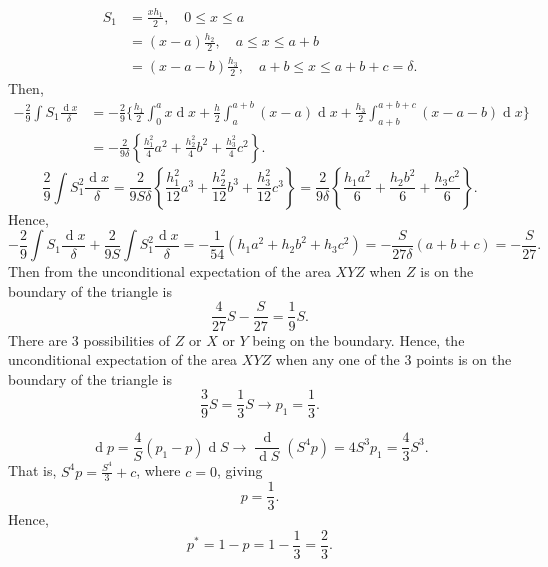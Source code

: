 \documentclass{article}
\DeclareMathOperator{\dif}{d}
\begin{document}
\begin{equation}
    \begin{split}
        S_{1} &= \frac{xh_{1}}{2},\quad 0 \leqslant x \leqslant a 
        \\
        &= (x - a)\frac{h_{2}}{2},\quad a \leqslant x \leqslant a + b
        \\
        &= (x - a - b)\frac{h_{3}}{2},\quad a + b \leqslant x \leqslant a + b + c = \delta.
    \end{split}
\end{equation}
Then,
\begin{equation}
    \begin{split}
        -\frac{2}{9}\int S_{1}\frac{\dif x}{\delta} &= -\frac{2}{9}\Bigg\{\frac{h_{1}}{2}\int_{0}^{a}x\dif x + \frac{h}{2}\int_{a}^{a + b}(x - a)\dif x + \frac{h_{3}}{2}\int_{a + b}^{a + b + c}(x - a - b)\dif x\Bigg\}
        \\
        &= -\frac{2}{9\delta}\left\{\frac{h_{1}^{2}}{4}a^{2} + \frac{h_{2}^{2}}{4}b^{2} + \frac{h_{3}^{2}}{4}c^{2}\right\}.
    \end{split}
\end{equation}
\begin{equation}
    \frac{2}{9}\int S_{1}^{2}\frac{\dif x}{\delta} = \frac{2}{9S\delta}\left\{\frac{h_{1}^{2}}{12}a^{3} + \frac{h_{2}^{2}}{12}b^{3} + \frac{h_{3}^{2}}{12}c^{3}\right\} = \frac{2}{9\delta}\left\{\frac{h_{1}a^{2}}{6} + \frac{h_{2}b^{2}}{6} + \frac{h_{3}c^{2}}{6}\right\}.
\end{equation}
Hence,
\begin{equation}
    -\frac{2}{9}\int S_{1}\frac{\dif x}{\delta} + \frac{2}{9S}\int S_{1}^{2}\frac{\dif x}{\delta} = -\frac{1}{54}(h_{1}a^{2} + h_{2}b^{2} + h_{3}c^{2}) = -\frac{S}{27\delta}(a + b + c) = -\frac{S}{27}.
\end{equation}
Then from the unconditional expectation of the area $XYZ$ when $Z$ is on the boundary of the triangle is
\begin{equation}
    \frac{4}{27}S - \frac{S}{27} = \frac{1}{9}S.
\end{equation}
There are $3$ possibilities of $Z$ or $X$ or $Y$ being on the boundary.
Hence, the unconditional expectation of the area $XYZ$ when any one of the $3$ points is on the boundary of the triangle is
\begin{equation}
    \frac{3}{9}S = \frac{1}{3}S \rightarrow p_{1} = \frac{1}{3}.
\end{equation}

\begin{equation}
    \dif p = \frac{4}{S}(p_{1} - p)\dif S \rightarrow \frac{\dif}{\dif S}(S^{4}p) = 4S^{3}p_{1} = \frac{4}{3}S^{3}.
\end{equation}
That is, $S^{4}p = \tfrac{S^{4}}{3} + c$, where $c = 0$, giving
\begin{equation}
    p = \frac{1}{3}.
\end{equation}
Hence,
\begin{equation}
    p^{*} =  1 - p = 1 - \frac{1}{3} = \frac{2}{3}.
\end{equation}
\end{document}
